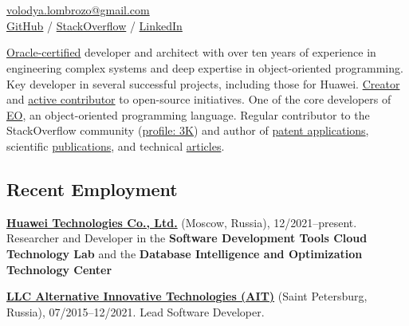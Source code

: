 \documentclass{vl}
\begin{document}
    \vlPrintPhoto{}

    \section*{\Large {}}

    \href{mailto:volodya.lombrozo@gmail.com}{volodya.lombrozo@gmail.com}\\%
    \href{https://github.com/volodya-lombrozo}{GitHub} /
    \href{https://stackoverflow.com/users/10423604/volodya-lombrozo}{StackOverflow} /
    \href{https://www.linkedin.com/in/vladimir-zakharov-lombrozo-b71744216/}{LinkedIn}

    \vspace*{24pt}

    \href{https://catalog-education.oracle.com/pls/certview/sharebadge?id=87F6A2FE819A5A5AF4120A05900AB28A461EE9A3EE9FBFA02721FADAEB3BCE19}{Oracle-certified}
    developer and architect with over ten years of experience in engineering complex systems
    and deep expertise in object-oriented programming.
    Key developer in several successful projects, including those for Huawei.
    \href{https://github.com/volodya-lombrozo?tab=repositories}{Creator} and
    \href{https://github.com/volodya-lombrozo}{active contributor} to open-source initiatives.
    One of the core developers of \href{https://www.eolang.org}{EO}, an object-oriented programming language.
    Regular contributor to the StackOverflow community
    (\href{https://stackoverflow.com/users/10423604/volodya-lombrozo}{profile: 3K}) and
    author of \href{https://patentscope.wipo.int/search/en/detail.jsf?docId=WO2025084948&_cid=P20-ME9V9B-07633-1}{patent applications}, scientific \href{https://arxiv.org/abs/2410.05631}{publications}, and technical
    \href{https://dzone.com/users/4993224/volodya-lombrozo.html}{articles}.

    \subsection*{Recent Employment}

    \textbf{\href{https://www.huawei.com}{Huawei Technologies Co., Ltd.}} (Moscow, Russia), 12/2021--present.
    Researcher and Developer in the \textbf{Software Development Tools Cloud Technology Lab} and the
    \textbf{Database Intelligence and Optimization Technology Center}

    \textbf{\href{https://altinntech.com/en/}{LLC Alternative Innovative Technologies (AIT)}} (Saint Petersburg, Russia),
    07/2015--12/2021.
    Lead Software Developer.
\end{document}
